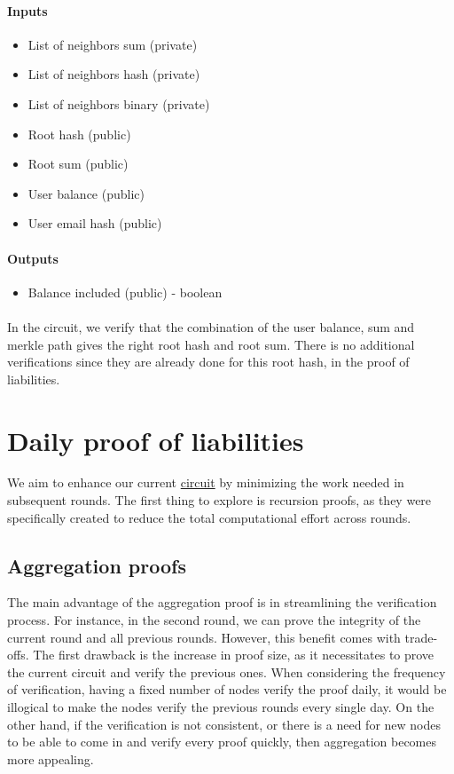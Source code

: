 \paragraph{Inputs}
\begin{itemize}
   \item List of neighbors sum (private)
   \item List of neighbors hash (private)
   \item List of neighbors binary (private)
   \item Root hash (public)
   \item Root sum (public)
   \item User balance (public)
   \item User email hash (public)
   \end{itemize}


\paragraph{Outputs}
\begin{itemize}
   \item Balance included (public) - boolean
   \end{itemize}

\paragraph{}
In the circuit, we verify that the combination of the user balance, sum and merkle path gives the right root hash and root sum. There is no additional
verifications since they are already done for this root hash, in the proof of liabilities.

\section{Daily proof of liabilities}
We aim to enhance our current \hyperref[subsec:pl]{circuit} by minimizing the work needed in subsequent rounds.
The first thing to explore is recursion proofs, as they were specifically created to reduce the total computational effort across rounds.

\subsection{Aggregation proofs}
The main advantage of the aggregation proof is in streamlining the verification process. For instance, in the second round, we can prove the integrity of the current round and all previous rounds.
However, this benefit comes with trade-offs. The first drawback is the increase in proof size, as it necessitates to prove the current circuit and verify the previous ones.
When considering the frequency of verification, having a fixed number of nodes verify the proof daily, it would be illogical to make the nodes verify the previous rounds every single day.
On the other hand, if the verification is not consistent, or there is a need for new nodes to be able to come in and verify every proof quickly, then aggregation becomes more appealing.

